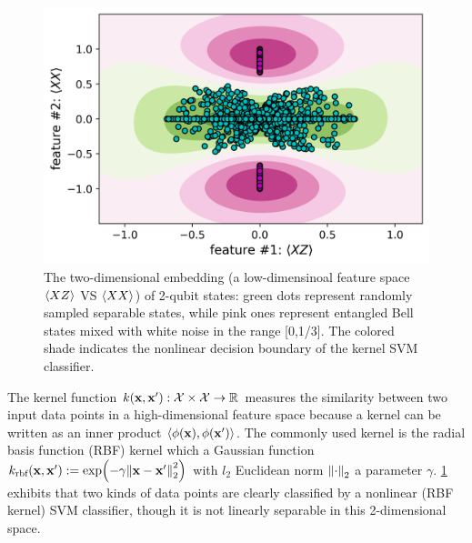 \documentclass[
aps,
pra,
twocolumn,
floatfix,
]{revtex4-2}
\theoremstyle{plain}
\theoremstyle{definition}
\newcommand{\kernel}{k}
\begin{document}
\begin{figure}[!ht]
	\centering
	\includegraphics[width=.9\linewidth]{./Code/feature_space_2d.png}
	\caption{The two-dimensional embedding (a low-dimensinoal feature space $\expval{XZ}$ VS $\expval{XX}$) of 2-qubit states: green dots represent randomly sampled separable states, while pink ones represent entangled Bell states mixed with white noise in the range [0,1/3]. The colored shade indicates the nonlinear decision boundary of the kernel SVM classifier.}
	\label{fig:feature_space}
\end{figure}
The kernel function $\kernel(\vbx,\vbx'):\mathcal{X}\times \mathcal{X} \to \realnumber$ measures the similarity between two input data points in a high-dimensional feature space because a kernel can be written as an inner product $\langle \phi(\vb{x}),\phi(\vb{x}') \rangle$.
The commonly used kernel is the radial basis function (RBF) kernel which a Gaussian function
$\kernel_{\text{rbf}}(\vbx,\vbx') := \exp(-\gamma\norm{\vbx-\vbx'}^2_2)$ with $l_2$ Euclidean norm $\norm{\cdot}_2$ a parameter $\gamma$.
\cref{fig:feature_space} exhibits that two kinds of data points are clearly classified by a nonlinear (RBF kernel) SVM classifier, though it is not linearly separable in this 2-dimensional space.
\end{document}
